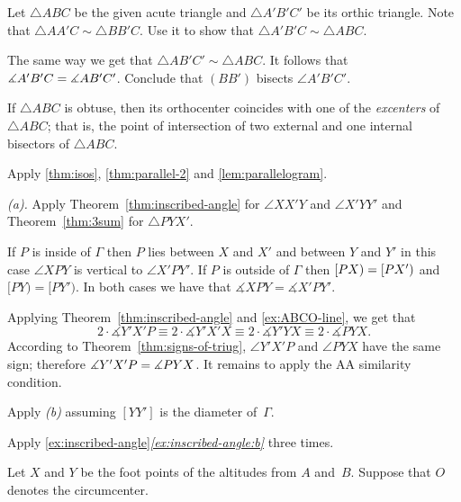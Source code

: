 Let $\triangle ABC$ be the given acute triangle and $\triangle A'B'C'$ 
be its orthic triangle.
Note that $\triangle AA'C\sim\triangle BB'C$.
Use it to show that $\triangle A'B'C\sim \triangle ABC$.

The same way we get that $\triangle AB'C'\sim \triangle ABC$.
It follows that $\measuredangle A'B'C\z=\measuredangle AB'C'$.
Conclude that $(BB')$ bisects $\angle A'B'C'$.

If $\triangle ABC$ is obtuse, then its orthocenter coincides with one of the \emph{excenters} of $\triangle ABC$;
that is, 
the point of intersection of two external and one internal bisectors of $\triangle ABC$.
 
 Apply \ref{thm:isos}, \ref{thm:parallel-2} 
and \ref{lem:parallelogram}.

\setcounter{eqtn}{0}

 \textit{(a).}
Apply Theorem~\ref{thm:inscribed-angle} for $\angle XX'Y$ and $\angle X'YY'$
and Theorem~\ref{thm:3sum} for $\triangle PYX'$.

 If $P$ is inside of $\Gamma$ then $P$ lies between $X$ and $X'$ and between $Y$ and $Y'$ in this case $\angle XPY$ is vertical to $\angle X'PY'$.
If $P$ is outside of $\Gamma$ then $[PX)\z=[PX')$ and $[PY)=[PY')$.
In both cases we have that $\measuredangle XPY=\measuredangle X'PY'$.

Applying Theorem~\ref{thm:inscribed-angle} and \ref{ex:ABCO-line}, we get that
\[2\cdot \measuredangle Y'X'P
\equiv
2\cdot \measuredangle Y'X'X 
\equiv
2\cdot\measuredangle Y'YX
\equiv
2\cdot\measuredangle PYX.\]
According to Theorem~\ref{thm:signs-of-triug}, $\angle Y'X'P$ and $\angle PYX$ have the same sign;
therefore
$\measuredangle Y'X'P\z= \measuredangle PYX$.
It remains to apply the AA similarity condition.

 Apply \textit{(b)} assuming $[YY']$ is the diameter of~$\Gamma$. 

 Apply \ref{ex:inscribed-angle}\textit{\ref{ex:inscribed-angle:b}}
three times.

Let $X$ and $Y$ be the foot points of the altitudes from $A$ and~$B$.
Suppose that $O$ denotes the circumcenter.
 
